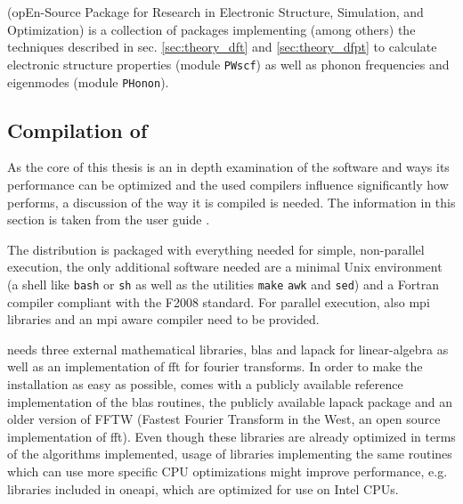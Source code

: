 \documentclass[main.tex]{subfiles}
\begin{document}
\section{\QE}\label{sec:qe}

\QE (opEn-Source Package for Research in Electronic Structure, Simulation, and Optimization) \cite{giannozzi_quantum_2009,giannozzi_advanced_2017} is a collection of packages implementing (among others) the techniques described in sec. \ref{sec:theory_dft} and \ref{sec:theory_dfpt} to calculate electronic structure properties (module \texttt{PWscf}) as well as phonon frequencies and eigenmodes (module \texttt{PHonon}).

\subsection{Compilation of \QE}\label{sub:qe_compilation}

As the core of this thesis is an in depth examination of the \QE software and ways its performance can be optimized and the used compilers influence significantly how \QE performs, a discussion of the way it is compiled is needed.
The information in this section is taken from the  user guide \cite{noauthor_quantum_nodate}.

The \QE distribution is packaged with everything needed for simple, non-parallel execution, the only additional software needed are a minimal Unix environment (a shell like \texttt{bash} or \texttt{sh} as well as the utilities \texttt{make} \texttt{awk} and \texttt{sed}) and a Fortran compiler compliant with the F2008 standard.
For parallel execution, also \gls{mpi} libraries and an \gls{mpi} aware compiler need to be provided.

\QE needs three external mathematical libraries, \gls{blas} and \gls{lapack} for linear-algebra as well as an implementation of \gls{fft} for fourier transforms.
In order to make the installation as easy as possible, \QE comes with a publicly available reference implementation of the \gls{blas} routines, the publicly available \gls{lapack} package and an older version of FFTW (Fastest Fourier Transform in the West, an open source implementation of \gls{fft}).
Even though these libraries are already optimized in terms of the algorithms implemented, usage of libraries implementing the same routines which can use more specific CPU optimizations might improve performance, e.g. libraries included in \gls{oneapi}, which are optimized for use on Intel CPUs.
\end{document}
